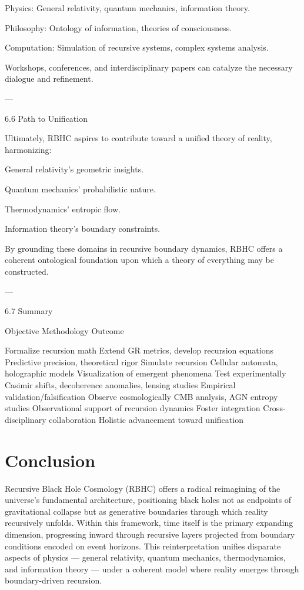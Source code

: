 \documentclass[11pt,a4paper]{article}
\begin{document}
Physics: General relativity, quantum mechanics, information theory.

Philosophy: Ontology of information, theories of consciousness.

Computation: Simulation of recursive systems, complex systems analysis.


Workshops, conferences, and interdisciplinary papers can catalyze the necessary dialogue and refinement.


---

6.6 Path to Unification

Ultimately, RBHC aspires to contribute toward a unified theory of reality, harmonizing:

General relativity’s geometric insights.

Quantum mechanics’ probabilistic nature.

Thermodynamics’ entropic flow.

Information theory’s boundary constraints.


By grounding these domains in recursive boundary dynamics, RBHC offers a coherent ontological foundation upon which a theory of everything may be constructed.


---

6.7 Summary

Objective	Methodology	Outcome

Formalize recursion math	Extend GR metrics, develop recursion equations	Predictive precision, theoretical rigor
Simulate recursion	Cellular automata, holographic models	Visualization of emergent phenomena
Test experimentally	Casimir shifts, decoherence anomalies, lensing studies	Empirical validation/falsification
Observe cosmologically	CMB analysis, AGN entropy studies	Observational support of recursion dynamics
Foster integration	Cross-disciplinary collaboration	Holistic advancement toward unification

\section{Conclusion}
Recursive Black Hole Cosmology (RBHC) offers a radical reimagining of the universe’s fundamental architecture, positioning black holes not as endpoints of gravitational collapse but as generative boundaries through which reality recursively unfolds. Within this framework, time itself is the primary expanding dimension, progressing inward through recursive layers projected from boundary conditions encoded on event horizons. This reinterpretation unifies disparate aspects of physics — general relativity, quantum mechanics, thermodynamics, and information theory — under a coherent model where reality emerges through boundary-driven recursion.
\end{document}
